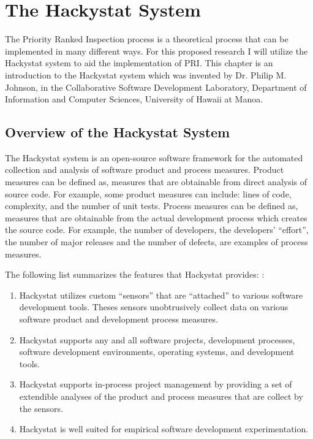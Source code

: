 
\chapter{The Hackystat System}
\label{chapter:hackystat}

The Priority Ranked Inspection process is a theoretical process that can be
implemented in many different ways. For this proposed research I will
utilize the Hackystat system to aid the implementation of PRI. This chapter
is an introduction to the Hackystat system which was invented by Dr. Philip 
M. Johnson, in the Collaborative Software Development Laboratory,
Department of Information and Computer Sciences, University of Hawaii at
Manoa. 

\section{Overview of the Hackystat System}
The Hackystat system is an open-source software framework for the automated
collection and analysis of software product and process measures. Product
measures can be defined as, measures that are obtainable from direct
analysis of source code. For example, some product measures can include:
lines of code, complexity, and the number of unit tests. Process measures
can be defined as, measures that are obtainable from the actual development
process which creates the source code. For example, the number of
developers, the developers' ``effort'', the number of major releases and
the number of defects, are examples of process measures. 

The following list summarizes the features that Hackystat provides: 
\cite{Johnson05}:

\begin{enumerate}
\item Hackystat utilizes custom ``sensors'' that are ``attached'' to
  various software development tools. Theses sensors unobtrusively collect
  data on various software product and development process measures. 
\item Hackystat supports any and all software projects, development
  processes, software development environments, operating systems, and
  development tools. 
\item Hackystat supports in-process project management by providing a set
  of extendible analyses of the product and process measures that are
  collect by the sensors.
\item Hackystat is well suited for empirical software development
  experimentation.
\end{enumerate}


